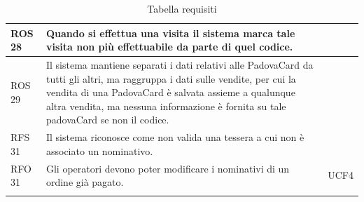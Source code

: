 \begin{center}
\begin{longtable}[H]{| p{} | p{} | p{}|}
ROS 28 & Quando si effettua una visita il sistema marca tale visita non più effettuabile da parte di quel codice.  &  \\ \hline
ROS 29 & Il sistema mantiene separati i dati relativi alle PadovaCard da tutti gli altri, ma raggruppa i dati sulle vendite, per cui la vendita di una PadovaCard è salvata assieme a qualunque altra vendita, ma nessuna informazione è fornita su tale padovaCard se non il codice.  &  \\ \hline
RFS 31 & Il sistema riconosce come non valida una tessera a cui non è associato un nominativo. &  \\ \hline
RFO 31 & Gli operatori devono poter modificare i nominativi di un ordine già pagato. & UCF4 \\ \hline
\caption{Tabella requisiti}
\end{longtable}
\end{center}

